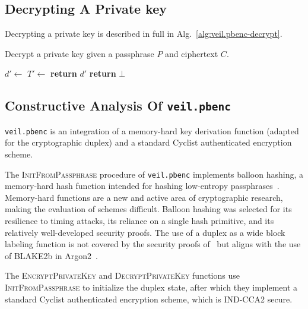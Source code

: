 \subsection{Decrypting A Private key}\label{subsec:veil.pbenc-decrypt}

Decrypting a private key is described in full in Alg.~\ref{alg:veil.pbenc-decrypt}\@.

\begin{algorithm}
    \caption{
        Decrypt a private key given a passphrase $P$ and ciphertext $C$.
    }
    \begin{algorithmic}
        \State {}
        \State $d' \gets$
        \State $T' \gets$
        \State \textbf{return} $d'$
        \Else
        \State \textbf{return} $\bot$
        \EndIf
        \EndFunction
    \end{algorithmic}\label{alg:veil.pbenc-decrypt}
\end{algorithm}

\subsection{Constructive Analysis Of \texttt{veil.pbenc}}\label{subsec:veil.pbenc-analysis}

\texttt{veil.pbenc} is an integration of a memory-hard key derivation function \@(adapted for the
cryptographic duplex) and a standard Cyclist authenticated encryption scheme.

The \textsc{InitFromPassphrase} procedure of \texttt{veil.pbenc} implements balloon hashing, a
memory-hard hash function intended for hashing low-entropy passphrases~\cite{boneh2016}. Memory-hard
functions are a new and active area of cryptographic research, making the evaluation of schemes
difficult. Balloon hashing was selected for its resilience to timing attacks, its reliance on a
single hash primitive, and its relatively well-developed security proofs. The use of a duplex as a
wide block labeling function is not covered by the security proofs
of~\cite[Appendix~B.3]{boneh2016} but aligns with the use of BLAKE2b in Argon2~\cite{rfc9106}.

The \textsc{EncryptPrivateKey} and \textsc{DecryptPrivateKey} functions use
\textsc{InitFromPassphrase} to initialize the duplex state, after which they implement a standard
Cyclist authenticated encryption scheme, which is IND-CCA2 secure.
